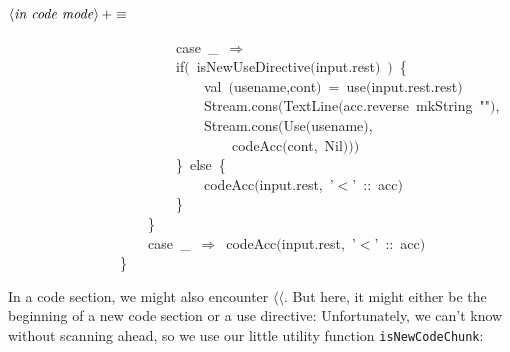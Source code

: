 \documentclass[a4paper,12pt]{article}
\begin{document}
$\left<\mbox{\emph{in code mode}}\right>+\equiv$
\begin{program}~~~~~~~~~~~~~~~~~~~~~~~~{\vem case}~\_~$\Rightarrow$
\\~~~~~~~~~~~~~~~~~~~~~~~~{\vem if}$($~isNewUseDirective$($input.rest$)$~$)$~{\small\{}
\\~~~~~~~~~~~~~~~~~~~~~~~~~~~~{\vem val}~$($usename,cont$)$~=~use$($input.rest.rest$)$
\\~~~~~~~~~~~~~~~~~~~~~~~~~~~~Stream.cons$($TextLine$($acc.reverse~mkString~""$)$,
\\~~~~~~~~~~~~~~~~~~~~~~~~~~~~Stream.cons$($Use$($usename$)$,
\\~~~~~~~~~~~~~~~~~~~~~~~~~~~~~~~~codeAcc$($cont,~Nil$)$$)$$)$
\\~~~~~~~~~~~~~~~~~~~~~~~~{\small\}}~{\vem else}~{\small\{}
\\~~~~~~~~~~~~~~~~~~~~~~~~~~~~codeAcc$($input.rest,~'$<$'~{\rm :}{\rm :}~acc$)$
\\~~~~~~~~~~~~~~~~~~~~~~~~{\small\}}
\\~~~~~~~~~~~~~~~~~~~~{\small\}}
\\~~~~~~~~~~~~~~~~~~~~{\vem case}~\_~$\Rightarrow$~codeAcc$($input.rest,~'$<$'~{\rm :}{\rm :}~acc$)$
\\~~~~~~~~~~~~~~~~{\small\}}
\\[0.5em]\end{program}
In a code section, we might also encounter \texttt{$\langle$$\langle$}. But here, it might either
be the beginning of a new code section or a use directive: Unfortunately,
we can't know without scanning ahead, so we use our little utility
function \texttt{isNewCodeChunk}:
\end{document}

